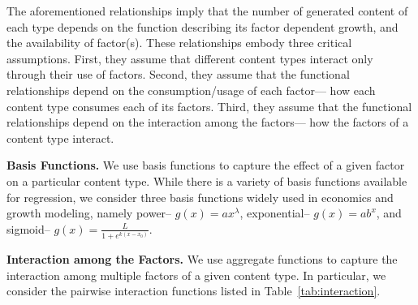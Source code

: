The aforementioned relationships imply that the number of generated content of each type depends on the function describing its factor dependent growth, and the availability of factor(s). These relationships embody three critical assumptions. First, they assume that different content types interact only through their use of factors. Second, they assume that the functional relationships depend on the consumption/usage of each factor--- how each content type consumes each of its factors. Third, they assume that the functional relationships depend on the interaction among the factors--- how the factors of a content type interact.

\textbf{Basis Functions.} We use basis functions to capture the effect of a given factor on a particular content type. While there is a variety of basis functions available for regression, we consider three basis functions widely used in economics and growth modeling, namely power-- $g(x) = ax^{\lambda}$, exponential-- $g(x) = ab^x$, and sigmoid-- $g(x) = \frac{L}{1+e^{k(x-x_0)}}$. 

\textbf{Interaction among the Factors.} We use aggregate functions to capture the interaction among multiple factors of a given content type. In particular, we consider the pairwise interaction functions listed in Table~\ref{tab:interaction}. 

